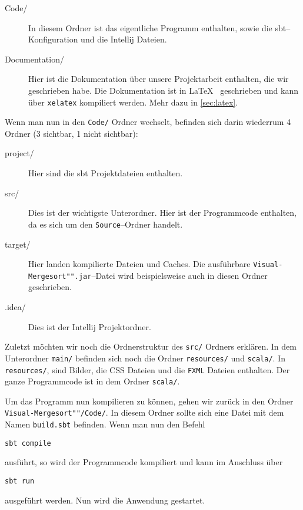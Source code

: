 \begin{description}
\item[Code/] In diesem Ordner ist das eigentliche Programm enthalten, sowie die sbt--Konfiguration und die Intellij Dateien.
\item[Documentation/] Hier ist die Dokumentation über unsere Projektarbeit enthalten, die wir geschrieben habe. Die Dokumentation ist in \LaTeX~ geschrieben und kann über \texttt{xelatex} kompiliert werden. Mehr dazu in \ref{sec:latex}.
\end{description}

Wenn man nun in den \texttt{Code/} Ordner wechselt, befinden sich darin wiederrum 4 Ordner (3 sichtbar, 1 nicht sichtbar):

\begin{description}
\item[project/] Hier sind die sbt Projektdateien enthalten.
\item[src/] Dies ist der wichtigste Unterordner. Hier ist der Programmcode enthalten, da es sich um den \texttt{Source}--Ordner handelt.
\item[target/] Hier landen kompilierte Dateien und Caches. Die ausführbare \texttt{Visual-Mergesort"".jar}--Datei wird beispielsweise auch in diesen Ordner geschrieben.
\item[.idea/] Dies ist der Intellij Projektordner.
\end{description}

Zuletzt möchten wir noch die Ordnerstruktur des \texttt{src/} Ordners erklären. In dem Unterordner \texttt{main/} befinden sich noch die Ordner \texttt{resources/} und \texttt{scala/}. In \texttt{resources/}, sind Bilder, die CSS Dateien und die \texttt{FXML} Dateien enthalten. Der ganze Programmcode ist in dem Ordner \texttt{scala/}.

Um das Programm nun kompilieren zu können, gehen wir zurück in den Ordner \texttt{Visual-Mergesort""/Code/}. In diesem Ordner sollte sich eine Datei mit dem Namen \texttt{build.sbt} befinden. Wenn man nun den Befehl

\begin{verbatim}
sbt compile
\end{verbatim}

ausführt, so wird der Programmcode kompiliert und kann im Anschluss über

\begin{verbatim}
sbt run
\end{verbatim}

ausgeführt werden. Nun wird die Anwendung gestartet.

